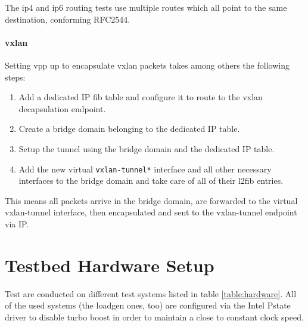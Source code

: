 The \Ac{ip4} and \Ac{ip6} routing tests use multiple routes which all
point to the same destination, conforming RFC2544.

\paragraph{\Ac{vxlan}}

Setting \Ac{vpp} up to encapsulate \Ac{vxlan} packets takes among
others the following steps:

\begin{enumerate}
	\item Add a dedicated IP \Ac{fib} table and configure it to route to the \Ac{vxlan} decapsulation endpoint.
	\item Create a bridge domain belonging to the dedicated IP table.
	\item Setup the tunnel using the bridge domain and the dedicated IP table.
	\item Add the new virtual \lstinline|vxlan-tunnel*| interface and all other necessary interfaces to the bridge domain and take care of all of their l2fib entries. 
\end{enumerate}

This means all packets arrive in the bridge domain, are forwarded to
the virtual vxlan-tunnel interface, then encapsulated and sent to the
vxlan-tunnel endpoint via IP.


\section{Testbed Hardware Setup}
\label{sec:hardware}

Test are conducted on different test systems listed in table
\ref{table:hardware}. All of the used systems (the \Ac{loadgen} ones,
too) are configured via the Intel Pstate driver to disable turbo boost
in order to maintain a close to constant clock speed.


